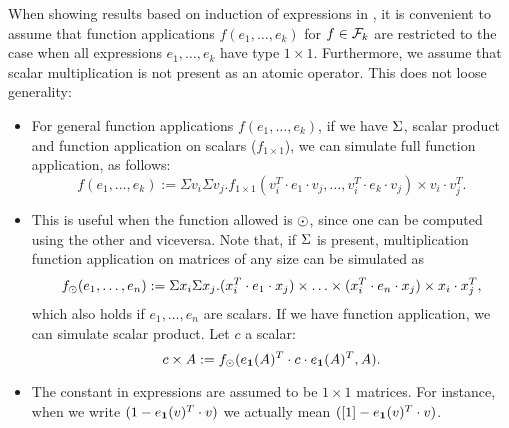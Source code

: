 When showing results based on induction of expressions in \langfor, it is convenient to assume that function applications $f(e_1,\ldots,e_k)$ for $f\in\mathcal{F}_k$ are restricted to
the case when all expressions $e_1,\ldots,e_k$ have type $1\times 1$. Furthermore, we assume that scalar multiplication is not present as an atomic operator. This does not loose generality:
%
%

\begin{itemize}
\item 
For general function applications $f(e_1,\ldots,e_k)$, if we have $\Sigma$, scalar product and function application on scalars ($f_{1\times 1}$), we can simulate full function application, as follows:
 $$
f(e_1,\ldots, e_k) :=\Sigma v_i \Sigma v_j. f_{1\times 1}(v_i^T\cdot e_1\cdot v_j, \ldots ,v_i^T\cdot e_k\cdot v_j) \times v_i\cdot v_j^T.
$$

\item  This is useful when the function allowed is $\odot$, since one can be computed using the other and viceversa.
Note that, if $\Sigma$ is present, multiplication function application on matrices of any size can be simulated as 
$$
f_{\odot}(e_1,\ldots, e_n) :=\Sigma x_i \Sigma x_j. (x_i^T\cdot e_1\cdot x_j)\times \ldots \times (x_i^T\cdot e_n\cdot x_j) \times x_i\cdot x_j^T,
$$
which also holds if $e_1,\ldots, e_n$ are scalars. If we have function application, we can simulate 
scalar product. Let $c$ a scalar:
$$
c\times A :=f_{\odot}(e_{\mathbf{1}}(A)^T\cdot c \cdot e_{\mathbf{1}}(A)^T, A).
$$




\item The constant in expressions are assumed to be $1\times 1$ matrices. 
For instance, when we write $(1-e_{\mathbf{1}}(v)^T\cdot v)$ we actually mean $([1]-e_{\mathbf{1}}(v)^T\cdot v)$.


\end{itemize}